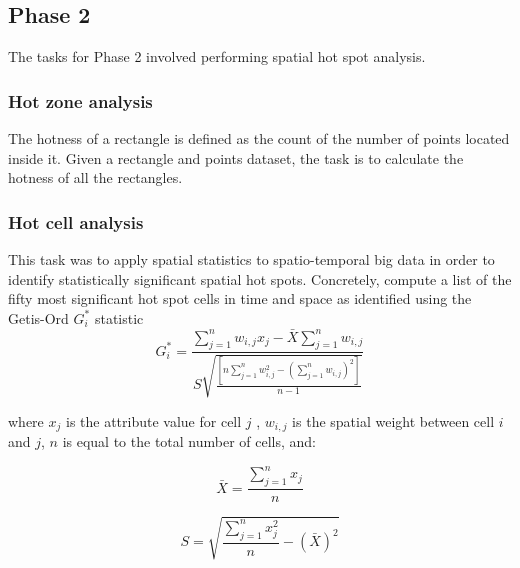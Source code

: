     \subsection{Phase 2} \label{Phase 1}%
    The tasks for Phase 2 involved performing spatial hot spot analysis.\\

    \subsubsection{Hot zone analysis}
    The hotness of a rectangle is defined as the count of the number of points located inside it. Given a rectangle and points dataset, the task is to calculate the hotness of all the rectangles.

    \subsubsection{Hot cell analysis}
    This task was to apply spatial statistics to spatio-temporal big data in order to identify statistically significant spatial hot spots. Concretely, compute a list of the fifty most significant hot spot cells in time and space as identified using the Getis-Ord $G_i^*$ statistic
    \begin{equation}
        G_i^*
        =
        \frac
        {
        \sum_{j=1}^{n}
        w_{i,j} x_j
        -
        \bar{X}
        \sum_{j=1}^{n}
        w_{i,j}
        }
        {
        S
        \sqrt
        {
        \frac
        {
        [
        n
        \sum_{j=1}^{n}
        w_{i,j}^2
        -
        (
        \sum_{j=1}^{n}
        w_{i,j}
        )^2
        ]
        }
        {
        n - 1
        }
        }
        }
    \end{equation}

    where $x_j$ is the attribute value for cell $j$ , $w_{i,j}$ is the spatial weight between cell $i$ and  $j$, $n$ is equal to the total number of cells, and:

    \begin{equation}
        \bar{X}
        =
        \frac
        {
        \sum_{j=1}^{n}
        x_j
        }
        {
        n
        }
    \end{equation}

    \begin{equation}
        S
        =
        \sqrt
        {
        \frac
        {
        \sum_{j=1}^{n}
        x_j^2
        }
        {
        n
        }
        -
        (
        \bar{X}
        )^2
        }
    \end{equation}

